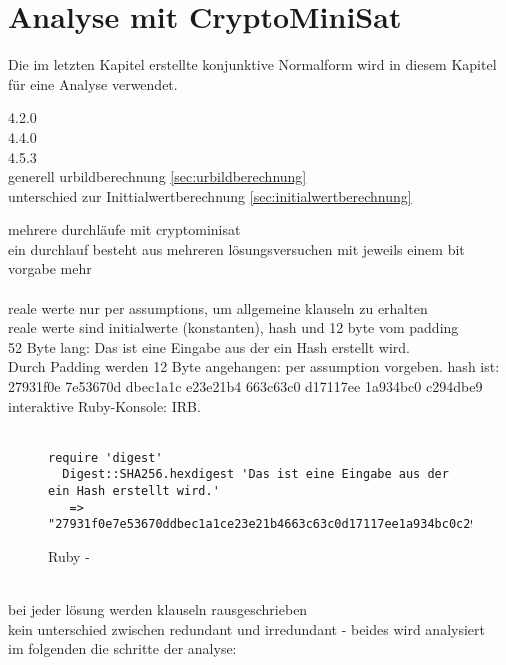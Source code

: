 \chapter{Analyse mit CryptoMiniSat}
\label{chp:analyse}

Die im letzten Kapitel erstellte konjunktive Normalform wird in diesem Kapitel für eine Analyse verwendet.

4.2.0\\
4.4.0\\
4.5.3\\

generell urbildberechnung \ref{sec:urbildberechnung}\\
unterschied zur Inittialwertberechnung \ref{sec:initialwertberechnung}

mehrere durchläufe mit cryptominisat\\
ein durchlauf besteht aus mehreren lösungsversuchen mit jeweils einem bit vorgabe mehr\\
~\\
reale werte nur per assumptions, um allgemeine klauseln zu erhalten\\
reale werte sind initialwerte (konstanten), hash und 12 byte vom padding\\
52 Byte lang: Das ist eine Eingabe aus der ein Hash erstellt wird.\\
Durch Padding werden 12 Byte angehangen: per assumption vorgeben.
hash ist: 27931f0e 7e53670d dbec1a1c e23e21b4 663c63c0 d17117ee 1a934bc0 c294dbe9\\
interaktive Ruby-Konsole: IRB.\\
\\
\begin{figure}[!h]
  \centering
  \begin{lstlisting}[]
  require 'digest'
  Digest::SHA256.hexdigest 'Das ist eine Eingabe aus der ein Hash erstellt wird.'
   => "27931f0e7e53670ddbec1a1ce23e21b4663c63c0d17117ee1a934bc0c294dbe9"
  \end{lstlisting}
  \caption{Ruby - }
  \label{fig:ruby-sha256}
\end{figure}
~\\
bei jeder lösung werden klauseln rausgeschrieben\\
kein unterschied zwischen redundant und irredundant - beides wird analysiert\\
im folgenden die schritte der analyse:





